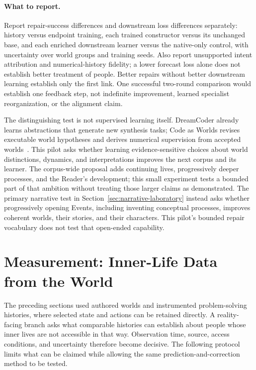 \documentclass[10pt]{article}
\begin{document}
\paragraph{What to report.}
Report repair-success differences and downstream loss differences separately:
history versus endpoint training, each trained constructor versus its unchanged
base, and each enriched downstream learner versus the native-only control,
with uncertainty over world groups and training seeds. Also report unsupported
intent attribution and numerical-history fidelity; a lower forecast loss
alone does not establish better treatment of people. Better repairs without
better downstream learning establish only the first link. One successful
two-round comparison would establish one feedback step, not indefinite
improvement, learned specialist reorganization, or the alignment claim.

The distinguishing test is not supervised learning itself. DreamCoder already
learns abstractions that generate new synthesis tasks; Code as Worlds revises
executable world hypotheses and derives numerical supervision from accepted
worlds~\cite{ellis2021dreamcoder,wang2026codeAsWorlds}. This pilot asks whether
learning evidence-sensitive choices about world distinctions, dynamics, and
interpretations improves the next corpus and its learner. The corpus-wide
proposal adds continuing lives, progressively deeper processes, and the
Reader's development; this small experiment tests a bounded part of that
ambition without treating those larger claims as demonstrated. The primary
narrative test in Section~\ref{sec:narrative-laboratory} instead asks whether
progressively opening Events, including inventing conceptual processes,
improves coherent worlds, their stories, and their characters. This pilot's bounded
repair vocabulary does not test that open-ended capability.

\section{Measurement: Inner-Life Data from the World}
\label{sec:measurement}

The preceding sections used authored worlds and instrumented problem-solving
histories, where selected state and actions can be retained directly. A
reality-facing branch asks what comparable histories can establish about
people whose inner lives are not accessible in that way. Observation time,
source, access conditions, and uncertainty therefore become decisive. The
following protocol limits what can be claimed while allowing the same
prediction-and-correction method to be tested.
\end{document}
